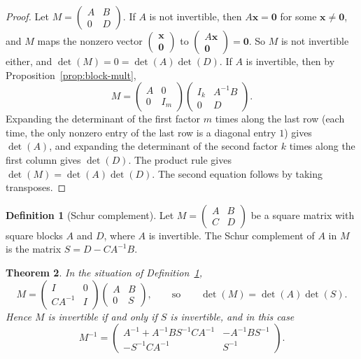 \documentclass[11pt]{article}
\theoremstyle{definition}
\newtheorem{definition}{Definition}[section]
\theoremstyle{plain}
\newtheorem{theorem}[definition]{Theorem}
\theoremstyle{remark}
\begin{document}
\begin{proof}
    Let $M = \begin{pmatrix} A & B \\ 0 & D \end{pmatrix}$. If $A$ is not invertible, then $A\mathbf{x} = \mathbf{0}$ for some $\mathbf{x} \neq \mathbf{0}$, and $M$ maps the nonzero vector $\begin{pmatrix} \mathbf{x} \\ \mathbf{0} \end{pmatrix}$ to $\begin{pmatrix} A\mathbf{x} \\ \mathbf{0} \end{pmatrix} = \mathbf{0}$. So $M$ is not invertible either, and $\det(M) = 0 = \det(A)\det(D)$. If $A$ is invertible, then by Proposition~\ref{prop:block-mult},
    \[M = \begin{pmatrix} A & 0 \\ 0 & I_m \end{pmatrix}\begin{pmatrix} I_k & A^{-1}B \\ 0 & D \end{pmatrix}.\]
    Expanding the determinant of the first factor $m$ times along the last row (each time, the only nonzero entry of the last row is a diagonal entry $1$) gives $\det(A)$, and expanding the determinant of the second factor $k$ times along the first column gives $\det(D)$. The product rule gives $\det(M) = \det(A)\det(D)$. The second equation follows by taking transposes.
\end{proof}

\begin{definition}[Schur complement]\label{def:schur}
    Let $M = \begin{pmatrix} A & B \\ C & D \end{pmatrix}$ be a square matrix with square blocks $A$ and $D$, where $A$ is invertible. The Schur complement of $A$ in $M$ is the matrix $S = D - CA^{-1}B$.
\end{definition}

\begin{theorem}\label{thm:schur}
    In the situation of Definition~\ref{def:schur},
    \[M = \begin{pmatrix} I & 0 \\ CA^{-1} & I \end{pmatrix}\begin{pmatrix} A & B \\ 0 & S \end{pmatrix}, \qquad \text{so} \qquad \det(M) = \det(A)\det(S).\]
    Hence $M$ is invertible if and only if $S$ is invertible, and in this case
    \[M^{-1} = \begin{pmatrix} A^{-1} + A^{-1}BS^{-1}CA^{-1} & -A^{-1}BS^{-1} \\ -S^{-1}CA^{-1} & S^{-1} \end{pmatrix}.\]
\end{theorem}
\end{document}
